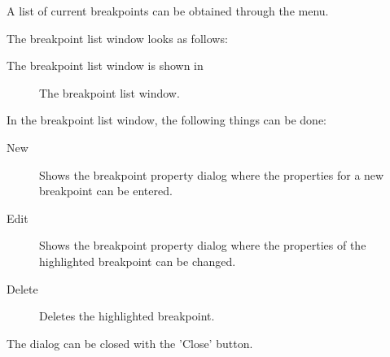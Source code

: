 A list of current breakpoints can be obtained through the
 menu. 
\begin{htmlonly}
The breakpoint list window looks as follows:
\end{htmlonly}
\begin{latexonly}
The breakpoint list window is shown in 
\begin{figure}[ht]
\caption{The breakpoint list window.}\label{fig:brklist}
\ifpdf
{}
\else
{}
\fi
\end{figure}
\end{latexonly}
In the breakpoint list window, the following things can be done:
\begin{description}
\item[New] Shows the breakpoint property dialog where the properties
for a new breakpoint can be entered. 
\item[Edit] Shows the breakpoint property dialog where the properties of
the highlighted breakpoint can be changed. 
\item[Delete] Deletes the highlighted breakpoint.
\end{description}
The dialog can be closed with the 'Close' button.

